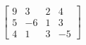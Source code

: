 \begin{equation*}
\begin{bmatrix}
9 & 3 & 2 & 4\\ 
5 & -6 & 1 & 3\\ 
4 & 1 & 3 & -5
\end{bmatrix}
\end{equation*}

